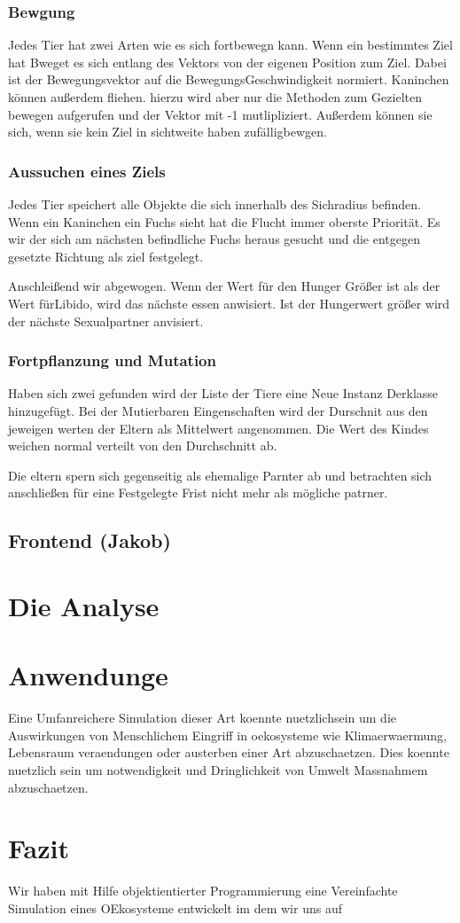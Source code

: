 \documentclass[12pt]{article}
\begin{document}
\subsubsection{Bewgung}
Jedes Tier hat zwei Arten wie es sich fortbewegn kann.
Wenn ein bestimmtes Ziel hat Bweget es sich entlang des Vektors von der eigenen Position zum Ziel.
Dabei ist der Bewegungsvektor auf die BewegungsGeschwindigkeit normiert.
Kaninchen können außerdem fliehen.
hierzu wird aber nur die Methoden zum Gezielten bewegen aufgerufen und der Vektor mit -1 mutlipliziert.
Außerdem können sie sich, wenn sie kein Ziel in sichtweite haben zufälligbewgen.

\subsubsection{Aussuchen eines Ziels}
Jedes Tier speichert alle Objekte die sich innerhalb des Sichradius befinden.
Wenn ein Kaninchen ein Fuchs sieht hat die Flucht immer oberste Priorität.
Es wir der sich am nächsten befindliche Fuchs heraus gesucht und die entgegen gesetzte Richtung als ziel festgelegt.

Anschleißend wir abgewogen.
Wenn der Wert für den Hunger Größer ist als der Wert fürLibido, wird das nächste essen anwisiert.
Ist der Hungerwert größer wird der nächste Sexualpartner anvisiert.
\subsubsection{Fortpflanzung und Mutation}
Haben sich zwei gefunden wird der Liste der Tiere eine Neue Instanz Derklasse hinzugefügt.
Bei der Mutierbaren Eingenschaften wird der Durschnit aus den jeweigen werten der Eltern als Mittelwert angenommen.
Die Wert des Kindes weichen normal verteilt von den Durchschnitt ab.

Die eltern spern sich gegenseitig als ehemalige Parnter ab und betrachten sich anschließen für eine Festgelegte Frist nicht mehr als mögliche patrner.

\subsection{Frontend (Jakob)}
\section{Die Analyse}

\section{Anwendunge}
Eine Umfanreichere Simulation dieser Art koennte nuetzlichsein um die Auswirkungen von Menschlichem Eingriff in oekosysteme wie Klimaerwaermung, Lebensraum veraendungen oder austerben einer Art abzuschaetzen.
Dies koennte nuetzlich sein um notwendigkeit und Dringlichkeit von Umwelt Massnahmem abzuschaetzen.
\section{Fazit}
Wir haben mit Hilfe objektientierter Programmierung eine Vereinfachte Simulation eines OEkosysteme entwickelt im dem wir uns auf 
\end{document}
